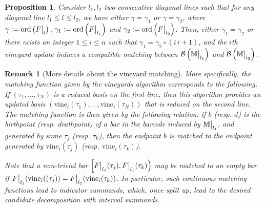 \documentclass{article}
\newcommand{\barcode}[1]{ {\mathcal B}\left(#1\right) }
\newcommand{\Mbb}{\mathbb{M}}
\newcommand{\vine}{\mathrm{vine}}
\newcommand\restr[2]{{  \left.\kern-\nulldelimiterspace #1 \vphantom{\big|} \right|_{#2}  }}
\newcommand{\mmaout}{candidate}
\newcommand{\ordonly}[0]{\ensuremath{\mathrm{ord}}}
\newcommand{\ord}[1]{\ensuremath{\ordonly\left(#1\right)}}
\newtheorem{proposition}[theorem]{Proposition}%
\newtheorem{remark}{Remark}%
\begin{document}
\def\vine{\ensuremath{\mathrm{vine}_i}}
\begin{proposition}\label{prop:vine_update_comp}
	Consider $l_1,l_2$ two consecutive diagonal lines such that
	for any diagonal line $l_1 \le l \le l_2 $, we have either
	$\gamma = \gamma_1$ or $\gamma = \gamma_2$, where
	$\gamma :=\ord{\restr F l}, \, \gamma_1 := \ord{\restr F {l_1}} $ and $\gamma_2:=\ord{\restr F {l_2}}$.
	Then, either $\gamma_1 = \gamma_2$ or there exists
	an integer $1\le i \le n$ such that $\gamma_1 = \gamma_2 \circ (i \, i+1)$,
	and the $i$th vineyard update
	induces a compatible matching between $\barcode{\restr{\Mbb}{l_1}}$ and
	$\barcode{\restr{\Mbb}{l_2}}$. \\
\end{proposition}

\begin{remark}[More details about the vineyard matching]
	More specifically,
	the matching function given by the vineyards algorithm corresponds to the following.
	If $(\tau_1, \dots, \tau_N)$ is a reduced basis on the first line,
	then this algorithm provides an updated basis
	$(\vine(\tau_1),\dots, \vine(\tau_N))$ that is reduced on the second line.
	The matching function is then given by the following relation:
	if $b$ (resp. $d$) is the birthpoint (resp. deathpoint) of a bar in the barcode induced by $\restr \Mbb {l_1}$, and generated by some $\tau_j$ (resp. $\tau_k$),
	then the endpoint $b$ is matched to the endpoint generated by $\vine(\tau_j)$ (resp. $\vine(\tau_k)$).

	Note that a non-trivial bar $\left[\restr F {l_1} (\tau_j), \restr F {l_1} (\tau_k) \right)$
	may be matched to an empty bar if $\restr F {l_2} (\vine((\tau_j)) =  \restr
		F {l_2} (\vine(\tau_k))$.
		In particular, such continuous matching functions lead to indicator summands, which,
		once split up, lead to the desired \mmaout{} decomposition with interval summands. \\
	\end{remark}
\end{document}
